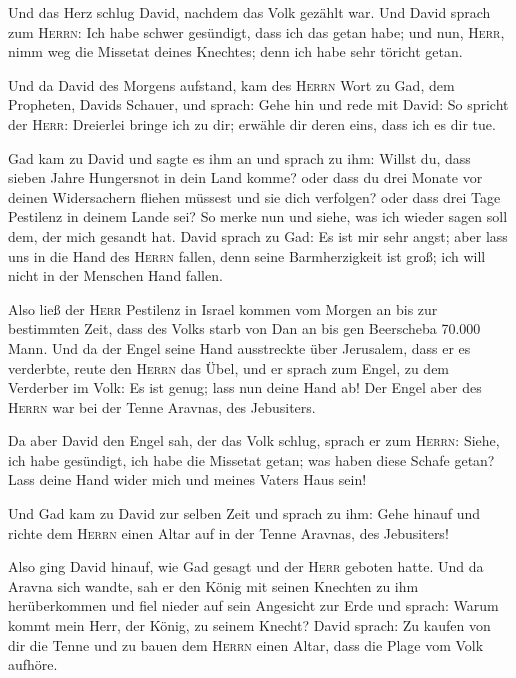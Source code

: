  Und das Herz schlug David, nachdem das Volk gezählt war.
Und David sprach zum \textsc{Herrn}: Ich habe schwer gesündigt, dass ich
das getan habe; und nun, \textsc{Herr}, nimm weg die Missetat deines
Knechtes; denn ich habe sehr töricht getan.

 Und da David des Morgens aufstand, kam des
\textsc{Herrn} Wort zu Gad, dem Propheten, Davids Schauer, und sprach:
 Gehe hin und rede mit David: So spricht der
\textsc{Herr}: Dreierlei bringe ich zu dir; erwähle dir deren eins, dass
ich es dir tue.

 Gad kam zu David und sagte es ihm an und sprach zu ihm:
Willst du, dass sieben Jahre Hungersnot in dein Land komme? oder dass du
drei Monate vor deinen Widersachern fliehen müssest und sie dich
verfolgen? oder dass drei Tage Pestilenz in deinem Lande sei? So merke
nun und siehe, was ich wieder sagen soll dem, der mich gesandt hat.
 David sprach zu Gad: Es ist mir sehr angst; aber lass
uns in die Hand des \textsc{Herrn} fallen, denn seine Barmherzigkeit ist
groß; ich will nicht in der Menschen Hand fallen.

 Also ließ der \textsc{Herr} Pestilenz in Israel kommen
vom Morgen an bis zur bestimmten Zeit, dass des Volks starb von Dan an
bis gen Beerscheba 70.000 Mann.  Und da der Engel seine
Hand ausstreckte über Jerusalem, dass er es verderbte, reute den
\textsc{Herrn} das Übel, und er sprach zum Engel, zu dem Verderber im
Volk: Es ist genug; lass nun deine Hand ab! Der Engel aber des
\textsc{Herrn} war bei der Tenne Aravnas, des Jebusiters.

 Da aber David den Engel sah, der das Volk schlug, sprach
er zum \textsc{Herrn}: Siehe, ich habe gesündigt, ich habe die Missetat
getan; was haben diese Schafe getan? Lass deine Hand wider mich und
meines Vaters Haus sein!

 Und Gad kam zu David zur selben Zeit und sprach zu ihm:
Gehe hinauf und richte dem \textsc{Herrn} einen Altar auf in der Tenne
Aravnas, des Jebusiters!

 Also ging David hinauf, wie Gad gesagt und der
\textsc{Herr} geboten hatte.  Und da Aravna sich wandte,
sah er den König mit seinen Knechten zu ihm herüberkommen und fiel
nieder auf sein Angesicht zur Erde  und sprach: Warum
kommt mein Herr, der König, zu seinem Knecht? David sprach: Zu kaufen
von dir die Tenne und zu bauen dem \textsc{Herrn} einen Altar, dass die
Plage vom Volk aufhöre.

